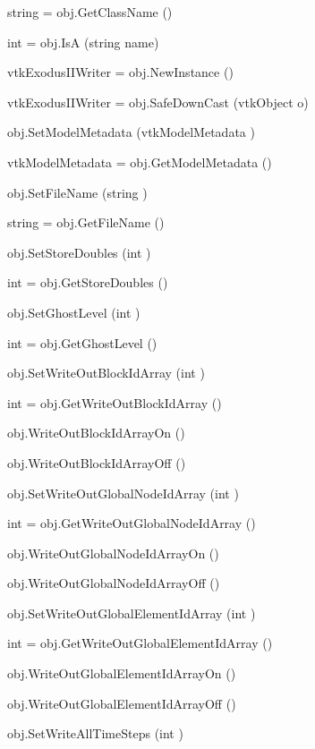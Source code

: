 \begin{DoxyItemize}
\item {\ttfamily string = obj.\-Get\-Class\-Name ()}  
\item {\ttfamily int = obj.\-Is\-A (string name)}  
\item {\ttfamily vtk\-Exodus\-I\-I\-Writer = obj.\-New\-Instance ()}  
\item {\ttfamily vtk\-Exodus\-I\-I\-Writer = obj.\-Safe\-Down\-Cast (vtk\-Object o)}  
\item {\ttfamily obj.\-Set\-Model\-Metadata (vtk\-Model\-Metadata )}  
\item {\ttfamily vtk\-Model\-Metadata = obj.\-Get\-Model\-Metadata ()}  
\item {\ttfamily obj.\-Set\-File\-Name (string )}  
\item {\ttfamily string = obj.\-Get\-File\-Name ()}  
\item {\ttfamily obj.\-Set\-Store\-Doubles (int )}  
\item {\ttfamily int = obj.\-Get\-Store\-Doubles ()}  
\item {\ttfamily obj.\-Set\-Ghost\-Level (int )}  
\item {\ttfamily int = obj.\-Get\-Ghost\-Level ()}  
\item {\ttfamily obj.\-Set\-Write\-Out\-Block\-Id\-Array (int )}  
\item {\ttfamily int = obj.\-Get\-Write\-Out\-Block\-Id\-Array ()}  
\item {\ttfamily obj.\-Write\-Out\-Block\-Id\-Array\-On ()}  
\item {\ttfamily obj.\-Write\-Out\-Block\-Id\-Array\-Off ()}  
\item {\ttfamily obj.\-Set\-Write\-Out\-Global\-Node\-Id\-Array (int )}  
\item {\ttfamily int = obj.\-Get\-Write\-Out\-Global\-Node\-Id\-Array ()}  
\item {\ttfamily obj.\-Write\-Out\-Global\-Node\-Id\-Array\-On ()}  
\item {\ttfamily obj.\-Write\-Out\-Global\-Node\-Id\-Array\-Off ()}  
\item {\ttfamily obj.\-Set\-Write\-Out\-Global\-Element\-Id\-Array (int )}  
\item {\ttfamily int = obj.\-Get\-Write\-Out\-Global\-Element\-Id\-Array ()}  
\item {\ttfamily obj.\-Write\-Out\-Global\-Element\-Id\-Array\-On ()}  
\item {\ttfamily obj.\-Write\-Out\-Global\-Element\-Id\-Array\-Off ()}  
\item {\ttfamily obj.\-Set\-Write\-All\-Time\-Steps (int )}  

\end{DoxyItemize}
